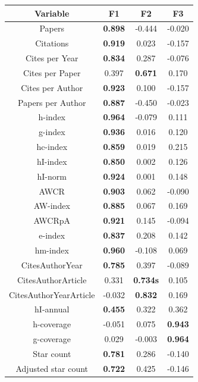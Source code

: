 \documentclass[12pt,a4paper]{article}
\begin{document}
\begin{tabular}{|c|c|c|c|}
\hline
\textbf{Variable} & \textbf{F1} & \textbf{F2} & \textbf{F3}\\
\hline
Papers & \textbf{0.898} & -0.444 & -0.020\\
\hline
Citations & \textbf{0.919} & 0.023 & -0.157\\
\hline
Cites per Year & \textbf{0.834} & 0.287 & -0.076\\
\hline
Cites per Paper & 0.397 & \textbf{0.671} & 0.170\\
\hline
Cites per Author & \textbf{0.923} & 0.100 & -0.157\\
\hline
Papers per Author & \textbf{0.887} & -0.450 & -0.023\\
\hline
h-index & \textbf{0.964} & -0.079 & 0.111\\
\hline
g-index & \textbf{0.936} & 0.016 & 0.120\\
\hline
hc-index & \textbf{0.859} & 0.019 & 0.215\\
\hline
hI-index & \textbf{0.850} & 0.002 & 0.126\\
\hline
hI-norm & \textbf{0.924} & 0.001 & 0.148\\
\hline
AWCR & \textbf{0.903} & 0.062 & -0.090\\
\hline
AW-index & \textbf{0.885} & 0.067 & 0.169\\
\hline
AWCRpA & \textbf{0.921} & 0.145 & -0.094\\
\hline
e-index & \textbf{0.837} & 0.208 & 0.142\\
\hline
hm-index & \textbf{0.960} & -0.108 & 0.069\\
\hline
CitesAuthorYear & \textbf{0.785} & 0.397 & -0.089\\
\hline
CitesAuthorArticle & 0.331 & \textbf{0.734s} & 0.105\\
\hline
CitesAuthorYearArticle & -0.032 & \textbf{0.832} & 0.169\\
\hline
hI-annual & \textbf{0.455} & 0.322 & 0.362\\
\hline
h-coverage & -0.051 & 0.075 & \textbf{0.943}\\
\hline
g-coverage & 0.029 & -0.003 & \textbf{0.964}\\
\hline
Star count & \textbf{0.781} & 0.286 & -0.140\\
\hline
Adjusted star count & \textbf{0.722} & 0.425 & -0.146\\
\hline
\end{tabular}
\begingroup
{}
\endgroup
\end{document}
